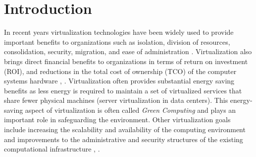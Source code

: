 	\section {Introduction}\label{sec:introduction}



	
	
	
	In recent years virtualization technologies have been widely used to provide important benefits to organizations such as isolation, division of resources, consolidation, security, migration, and ease of administration \cite{Varasteh2017}.
	Virtualization also brings direct financial benefits to organizations in terms of return on investment (ROI), and reductions in the total cost of ownership (TCO) of the computer systems hardware \cite{Solis2014}, \cite{AbdElRahem2016}. Virtualization often provides substantial energy saving benefits as less energy is required to maintain a set of virtualized services that share fewer physical machines (server virtualization in data centers). This energy-saving aspect of virtualization is often called \textit{Green Computing} \cite {Thathera2015, Ranjith2017, Jing2011} and plays an important role in safeguarding the environment.	Other virtualization goals include increasing the scalability and availability of the computing environment and improvements to the administrative and security structures of the existing computational infrastructure \cite{Kusnetzky2011}, \cite{Hui2014}.
	
